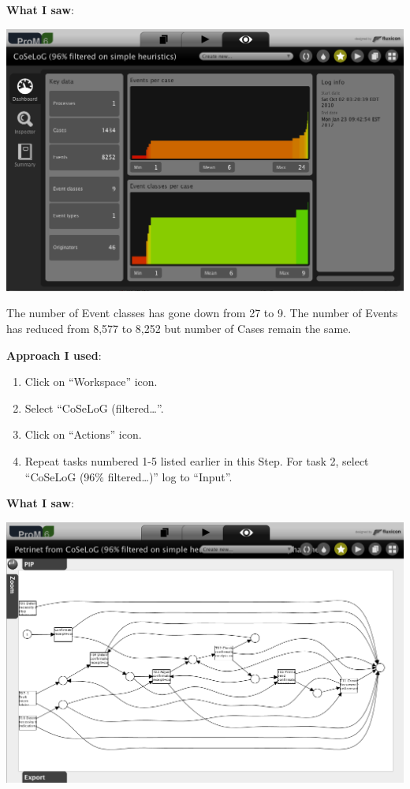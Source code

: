 \documentclass[]{article}
\begin{document}
\textbf{What I saw}:

\includegraphics{CoSeLoG_Step_05_Filter96.png}

The number of Event classes has gone down from 27 to 9. The number of
Events has reduced from 8,577 to 8,252 but number of Cases remain the
same.

\textbf{Approach I used}:

\begin{enumerate}
\def\labelenumi{\arabic{enumi}.}
\setcounter{enumi}{18}
\itemsep1pt\parskip0pt
\item
  Click on ``Workspace'' icon.
\item
  Select ``CoSeLoG (filtered\ldots{}''.\\
\item
  Click on ``Actions'' icon.\\
\item
  Repeat tasks numbered 1-5 listed earlier in this Step. For task 2,
  select ``CoSeLoG (96\% filtered\ldots{})'' log to ``Input''.
\end{enumerate}

\textbf{What I saw}:

\includegraphics{CoSeLoG_Step_05_Filter96_PetriNet_Alpha.png}
\end{document}
